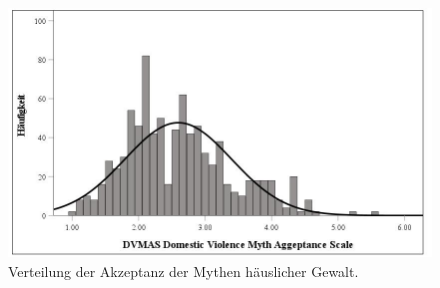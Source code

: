 \begin{figure}[htb]
    \centering
        \includegraphics[width=0.8\linewidth]{Histogramm DVMAS.jpg}
        \caption[Histogramm DVMAS]{Verteilung der Akzeptanz der Mythen häuslicher Gewalt.}
        \label{Histogramm DVMAS}
\end{figure}

